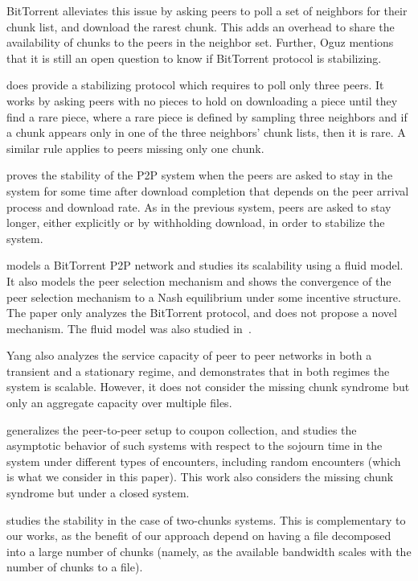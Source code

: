 \documentclass[11pt,conference]{IEEEtran}
\begin{document}
BitTorrent alleviates this issue by asking peers to poll a set of neighbors for their chunk list, and download the rarest chunk. This adds an overhead to share the availability of chunks to the peers in the neighbor set. Further, Oguz\cite{Oguz:EECS-2012-6} mentions that it is still an open question to know if BitTorrent protocol is stabilizing.

\cite{Oguz:EECS-2012-6} does provide a stabilizing protocol which requires to poll only three peers. It works by asking peers with no pieces to hold on downloading a piece until they find a rare piece, where a rare piece is defined by sampling three neighbors and if a chunk appears only in one of the three neighbors' chunk lists, then it is rare. A similar rule applies to peers missing only one chunk.

\cite{Zhu2011Stability} proves the stability of the P2P system when the peers are asked to stay in the system for some time after download completion that depends on the peer arrival process and download rate. As in the previous system, peers are asked to stay longer, either explicitly or by withholding download, in order to stabilize the system.

\cite{Qiu2004Modeling} models a BitTorrent P2P network and studies its scalability using a fluid model. It also models the peer selection mechanism and shows the convergence of the peer selection mechanism to a Nash equilibrium under some incentive structure. The paper only analyzes the BitTorrent protocol, and does not propose a novel mechanism. The fluid model was also studied in~\cite{Chow2009}.

Yang\cite{Yang2004Service}\cite{Yang2006} also analyzes the service capacity of peer to peer networks in both a transient and a stationary regime, and demonstrates that in both regimes the system is scalable. However, it does not consider the missing chunk syndrome but only an aggregate capacity over multiple files.

\cite{Massoulie2005Coupon} generalizes the peer-to-peer setup to coupon collection, and studies the asymptotic behavior of such systems with respect to the sojourn time in the system under different types of encounters, including random encounters (which is what we consider in this paper). This work also considers the missing chunk syndrome but under a closed system.

\cite{Norros2011Stability} studies the stability in the case of two-chunks systems. This is complementary to our works, as the benefit of our approach depend on having a file decomposed into a large number of chunks (namely, as the available bandwidth scales with the number of chunks  to a file).
\end{document}

